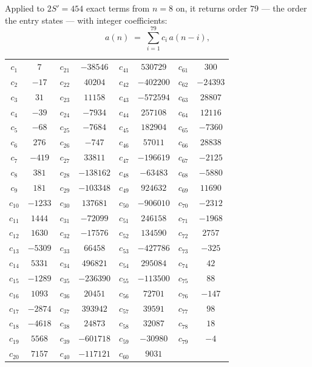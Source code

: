 \documentclass[11pt,a4paper]{article}
\theoremstyle{plain}
\theoremstyle{definition}
\begin{document}
Applied to $2S'=454$ exact terms from $n=8$ on, it returns order $79$ --- the
order the entry states --- with integer coefficients:
\[
a(n)\;=\;\sum_{i=1}^{79}c_i\,a(n-i),
\]
\begin{center}\small
\begin{tabular}{cccccccc}
$c_{1}$ & $7$ & $c_{21}$ & $-38546$ & $c_{41}$ & $530729$ & $c_{61}$ & $300$ \\
$c_{2}$ & $-17$ & $c_{22}$ & $40204$ & $c_{42}$ & $-402200$ & $c_{62}$ & $-24393$ \\
$c_{3}$ & $31$ & $c_{23}$ & $11158$ & $c_{43}$ & $-572594$ & $c_{63}$ & $28807$ \\
$c_{4}$ & $-39$ & $c_{24}$ & $-7934$ & $c_{44}$ & $257108$ & $c_{64}$ & $12116$ \\
$c_{5}$ & $-68$ & $c_{25}$ & $-7684$ & $c_{45}$ & $182904$ & $c_{65}$ & $-7360$ \\
$c_{6}$ & $276$ & $c_{26}$ & $-747$ & $c_{46}$ & $57011$ & $c_{66}$ & $28838$ \\
$c_{7}$ & $-419$ & $c_{27}$ & $33811$ & $c_{47}$ & $-196619$ & $c_{67}$ & $-2125$ \\
$c_{8}$ & $381$ & $c_{28}$ & $-138162$ & $c_{48}$ & $-63483$ & $c_{68}$ & $-5880$ \\
$c_{9}$ & $181$ & $c_{29}$ & $-103348$ & $c_{49}$ & $924632$ & $c_{69}$ & $11690$ \\
$c_{10}$ & $-1233$ & $c_{30}$ & $137681$ & $c_{50}$ & $-906010$ & $c_{70}$ & $-2312$ \\
$c_{11}$ & $1444$ & $c_{31}$ & $-72099$ & $c_{51}$ & $246158$ & $c_{71}$ & $-1968$ \\
$c_{12}$ & $1630$ & $c_{32}$ & $-17576$ & $c_{52}$ & $134590$ & $c_{72}$ & $2757$ \\
$c_{13}$ & $-5309$ & $c_{33}$ & $66458$ & $c_{53}$ & $-427786$ & $c_{73}$ & $-325$ \\
$c_{14}$ & $5331$ & $c_{34}$ & $496821$ & $c_{54}$ & $295084$ & $c_{74}$ & $42$ \\
$c_{15}$ & $-1289$ & $c_{35}$ & $-236390$ & $c_{55}$ & $-113500$ & $c_{75}$ & $88$ \\
$c_{16}$ & $1093$ & $c_{36}$ & $20451$ & $c_{56}$ & $72701$ & $c_{76}$ & $-147$ \\
$c_{17}$ & $-2874$ & $c_{37}$ & $393942$ & $c_{57}$ & $39591$ & $c_{77}$ & $98$ \\
$c_{18}$ & $-4618$ & $c_{38}$ & $24873$ & $c_{58}$ & $32087$ & $c_{78}$ & $18$ \\
$c_{19}$ & $5568$ & $c_{39}$ & $-601718$ & $c_{59}$ & $-30980$ & $c_{79}$ & $-4$ \\
$c_{20}$ & $7157$ & $c_{40}$ & $-117121$ & $c_{60}$ & $9031$ &  &  \\
\end{tabular}
\end{center}
\end{document}
